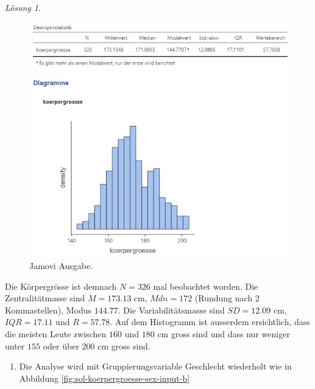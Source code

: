 \documentclass[
]{book}
\providecommand{\tightlist}{%
  \setlength{\itemsep}{0pt}\setlength{\parskip}{0pt}}
\theoremstyle{definition}
\theoremstyle{definition}
\theoremstyle{definition}
\theoremstyle{definition}
\theoremstyle{remark}
\newtheorem*{solution}{Lösung}
\begin{document}
\begin{solution}
\begin{figure}
\includegraphics[width=1\linewidth]{figures/02-exr-koerpergroesse-sex-jmv-output-a} \caption{Jamovi Ausgabe.}\label{fig:sol-koerpergroesse-sex-output-a}
\end{figure}

Die Körpergrösse ist demnach \(N=326\) mal beobachtet worden. Die Zentralitätmasse sind \(M=173.13\) cm, \(Mdn=172\) (Rundung nach 2 Kommastellen), Modus \(144.77\). Die Variabilitätsmasse sind \(SD=12.09\) cm, \(IQR=17.11\) und \(R=57.78\). Auf dem Histogramm ist ausserdem ersichtlich, dass die meisten Leute zwischen \(160\) und \(180\) cm gross sind und dass nur weniger unter \(155\) oder über \(200\) cm gross sind.

\begin{enumerate}
\def\labelenumi{(\alph{enumi})}
\setcounter{enumi}{1}
\tightlist
\item
  Die Analyse wird mit Gruppierungsvariable Geschlecht wiederholt wie in Abbildung \ref{fig:sol-koerpergroesse-sex-input-b}
\end{enumerate}


\end{solution}
\end{document}
